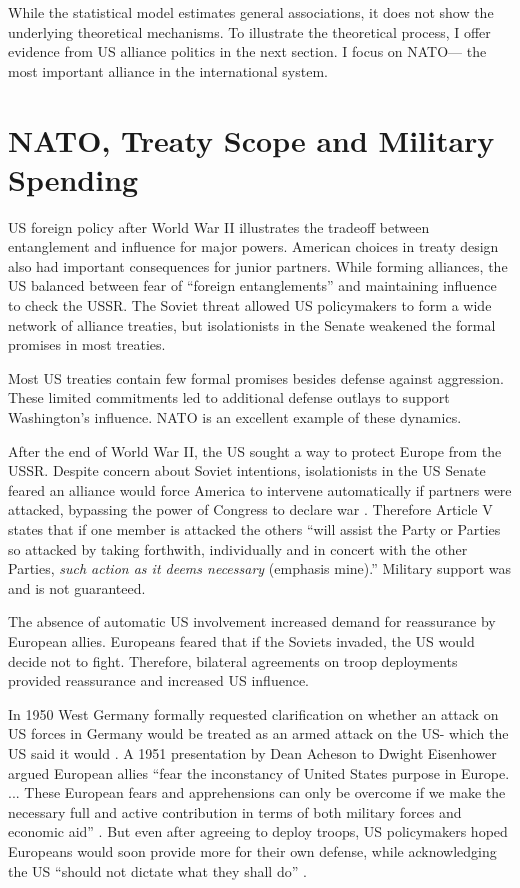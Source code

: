\documentclass[12pt]{article}
\begin{document}
While the statistical model estimates general associations, it does not show the underlying theoretical mechanisms. 
To illustrate the theoretical process, I offer evidence from US alliance politics in the next section.  
I focus on NATO--- the most important alliance in the international system. 


\section{NATO, Treaty Scope and Military Spending}


US foreign policy after World War II illustrates the tradeoff between entanglement and influence for major powers.
American choices in treaty design also had important consequences for junior partners. 
While forming alliances, the US balanced between fear of ``foreign entanglements'' and maintaining influence to check the USSR.
The Soviet threat allowed US policymakers to form a wide network of alliance treaties, but isolationists in the Senate weakened the formal promises in most treaties. 


Most US treaties contain few formal promises besides defense against aggression. 
These limited commitments led to additional defense outlays to support Washington's influence.  
NATO is an excellent example of these dynamics. 


After the end of World War II, the US sought a way to protect Europe from the USSR. 
Despite concern about Soviet intentions, isolationists in the US Senate feared an alliance would force America to intervene automatically if partners were attacked, bypassing the power of Congress to declare war \citep[pg. 280-1]{Acheson1969}.
Therefore Article V states that if one member is attacked the others ``will assist the Party or Parties so attacked by taking forthwith, individually and in concert with the other Parties, \emph{such action as it deems necessary} (emphasis mine).'' 
Military support was and is not guaranteed. 


The absence of automatic US involvement increased demand for reassurance by European allies. 
Europeans feared that if the Soviets invaded, the US would decide not to fight. 
Therefore, bilateral agreements on troop deployments provided reassurance and increased US influence. 


In 1950 West Germany formally requested clarification on whether an attack on US forces in Germany would be treated as an armed attack on the US- which the US said it would \citep[pg. 395]{Acheson1969}. 
A 1951 presentation by Dean Acheson to Dwight Eisenhower argued European allies ``fear the inconstancy of United States purpose in Europe. ... These European fears and apprehensions can only be overcome if we make the necessary full and active contribution in terms of both military forces and economic aid'' \citep[pg. 3]{Acheson1951}.  
But even after agreeing to deploy troops, US policymakers hoped Europeans would soon provide more for their own defense, while acknowledging the US ``should not dictate what they shall do'' \citep[pg. 2]{Johnson1950}. 
\end{document}
